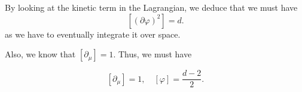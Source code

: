\documentclass[a4paper]{article}
\begin{document}
By looking at the kinetic term in the Lagrangian, we deduce that we must have
\[
  [(\partial \varphi)^2] = d.
\]
as we have to eventually integrate it over space.

Also, we know that $[\partial_\mu] = 1$. Thus, we must have
\begin{prop}
  \[
    [\partial_\mu] = 1,\quad [\varphi] = \frac{d - 2}{2}.
  \]
\end{prop}

%
%
\end{document}
